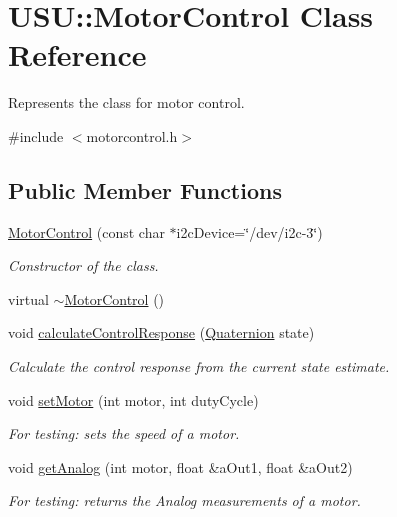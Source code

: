 \hypertarget{class_u_s_u_1_1_motor_control}{\section{\-U\-S\-U\-:\-:\-Motor\-Control \-Class \-Reference}
\label{class_u_s_u_1_1_motor_control}
}


\-Represents the class for motor control.  




{\ttfamily \#include $<$motorcontrol.\-h$>$}

\subsection*{\-Public \-Member \-Functions}
\begin{DoxyCompactItemize}
\item 
\hyperlink{class_u_s_u_1_1_motor_control_a85b6eed3bdd71d61a690395156999888}{\-Motor\-Control} (const char $\ast$i2c\-Device=\char`\"{}/dev/i2c-\/3\char`\"{})
\begin{DoxyCompactList}\small\item\em \-Constructor of the class. \end{DoxyCompactList}\item 
virtual \hyperlink{class_u_s_u_1_1_motor_control_a5bc78d24ed52a012a3f81cd3b62216f3}{$\sim$\-Motor\-Control} ()
\item 
void \hyperlink{class_u_s_u_1_1_motor_control_a40b7e40ce5bfb7fb0dea6c0a75d1eb5e}{calculate\-Control\-Response} (\hyperlink{class_u_s_u_1_1_quaternion}{\-Quaternion} state)
\begin{DoxyCompactList}\small\item\em \-Calculate the control response from the current state estimate. \end{DoxyCompactList}\item 
void \hyperlink{class_u_s_u_1_1_motor_control_ad08369ed288a7816de1b3c423684f0da}{set\-Motor} (int motor, int duty\-Cycle)
\begin{DoxyCompactList}\small\item\em \-For testing\-: sets the speed of a motor. \end{DoxyCompactList}\item 
void \hyperlink{class_u_s_u_1_1_motor_control_a3304fd7022bf2468859a0d2edae0e2f0}{get\-Analog} (int motor, float \&a\-Out1, float \&a\-Out2)
\begin{DoxyCompactList}\small\item\em \-For testing\-: returns the \-Analog measurements of a motor. \end{DoxyCompactList}\item 

\end{DoxyCompactItemize}
